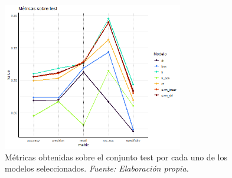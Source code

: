 \documentclass[12pt,a4paper,]{book}
\numberwithin{dummy}{section}
\theoremstyle{ocrenumbox}
\theoremstyle{blacknumex}
\theoremstyle{blacknumbox}
\theoremstyle{ocrenum}
\theoremstyle{ocrenum}
\begin{document}
\begin{table}[]
\centering
{}
\caption[Métricas sobre el conjunto test]{Métricas sobre el conjunto test. \it Fuente: Elaboración propia.}
\label{tab:metricas_test}
\end{table}

\begin{figure}[h]
\centering
\includegraphics[width =0.7\textwidth]{graficos/test_metrics.png}
\caption[Gráfico de métricas obtenidas sobre el conjunto test]{Métricas obtenidas sobre el conjunto test por cada uno de los modelos seleccionados. \it Fuente: Elaboración propia.}
\label{fig:test_metrics}
\end{figure}
\end{document}
